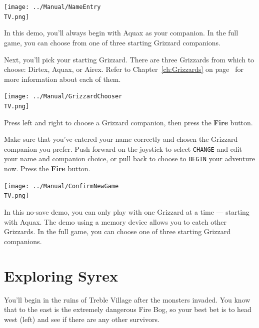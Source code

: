 \documentclass[10pt,twocolumn,openany,article]{memoir}
\newcommand\TV{NTSC} %
\begin{document}
\begin{center}
  \texttt{[image: ../Manual/NameEntry\\TV.png]}
\end{center}

\ifdefined\DEMO

In this demo,  you'll always begin with Aquax as  your companion. In the
full game, you can choose from one of three starting Grizzard companions.

\else

Next, you'll pick your starting Grizzard. There are three Grizzards from
which    to    choose:   Dirtex,    Aquax,    or    Airex.   Refer    to
Chapter~\ref{ch:Grizzards}   on  page~\pageref{ch:Grizzards}   for  more
information about each of them.

\begin{center}
  \texttt{[image: ../Manual/GrizzardChooser\\TV.png]}
\end{center}

Press left  and right  to choose  a Grizzard  companion, then  press the
\textbf{Fire} button.

Make  sure  that you've  entered  your  name  correctly and  chosen  the
Grizzard companion  you prefer. Push  forward on the joystick  to select
\texttt{CHANGE} and edit your name and companion choice, or pull back to
choose    to   \texttt{BEGIN}    your   adventure    now.   Press    the
\textbf{Fire} button.

\begin{center}
  \texttt{[image: ../Manual/ConfirmNewGame\\TV.png]}
\end{center}

\fi
\fi
\ifdefined\NOSAVE

In this no-save demo, you can only  play with one Grizzard at a time ---
starting with Aquax. The demo using  a memory device allows you to catch
other Grizzards. In the full game,  you can choose one of three starting
Grizzard companions.

\fi

\section{Exploring Syrex}

You'll begin in the ruins of  Treble Village after the monsters invaded.
You know that to  the east is the extremely dangerous  Fire Bog, so your
best  bet   is  to  head   west  (left)  and   see  if  there   are  any
other survivors.
\end{document}
